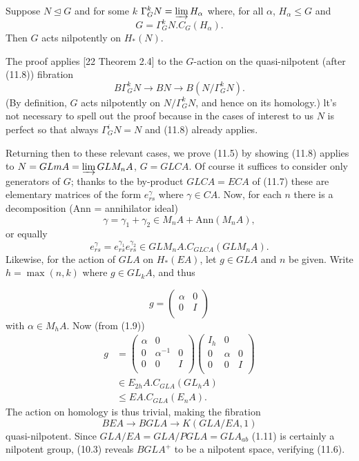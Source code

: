 \begin{prop}
  Suppose $N\unlhd G$ and for some $k$ $\Gamma_G^k N = \varinjlim H_\alpha$ where, for all $\alpha$, $H_\alpha\leqslant G$ and
\[G = \Gamma_G^k N . C_G(H_\alpha).\]
Then $G$ acts nilpotently on $H_*(N)$.
\end{prop}

The proof applies [22 Theorem 2.4] to the $G$-action on the quasi-nilpotent (after (11.8)) fibration
\[B\Gamma_G^k N\longrightarrow BN \longrightarrow B(N/\Gamma_G^k N).\]
(By definition, $G$ acts nilpotently on $N/\Gamma_G^k N$, and hence on its homology.) lt's not necessary to spell out the proof because in the cases of interest to us $N$ is perfect so that always $\Gamma_G^i N = N$ and (11.8) already applies.

Returning then to these relevant cases, we prove (11.5) by showing (11.8) applies to
$N = GLmA = \varinjlim GLM_nA$, $G = GLCA$. Of course it suffices to consider only generators of $G$; thanks to the by-product $GLCA= ECA$ of (11.7) these are elementary matrices of the form $e_{rs}^\gamma$ where $\gamma \in CA$. Now, for each $n$ there is a decomposition ($\mathrm{Ann}$ = annihilator ideal)
\[\gamma= \gamma_1+ \gamma_2 \in M_nA + \mathrm{Ann}(M_nA),\]
or equally
\[e_{rs}^{\gamma} = e_{rs}^{\gamma_1}e_{rs}^{\gamma_2}\in GLM_nA.C_{GLCA}(GLM_nA). \]
Likewise, for the action of $GLA$ on $H_*(EA)$, let $g \in GLA$ and $n$ be given. Write $h = \max (n, k)$ where $g \in GL_kA$, and thus 

\[g=\begin{pmatrix}
  \alpha & 0\\
  0 & I\\
\end{pmatrix}\]
with $\alpha \in M_h A$. Now (from (1.9))
\begin{align*}
  g &=\begin{pmatrix}
  \alpha & 0 & \\
  0 &\alpha^{-1} & 0\\
  0 &0& I\\
\end{pmatrix}\begin{pmatrix}
  I_h& 0 & \\
  0 &\alpha & 0\\
  0 &0& I\\
\end{pmatrix} \\
& \in E_{2h}A.C_{GLA}(GL_hA)\\
&  \leqslant EA.C_{GLA}(E_nA).
\end{align*}
The action on homology is thus trivial, making the fibration 
$$BEA \longrightarrow BGLA \longrightarrow K(GLA/EA, 1)$$
quasi-nilpotent. Since $GLA/EA = GLA/PGLA =GLA_{ab}$ (1.11) is certainly a nilpotent group,
(10.3) reveals $BGLA^+$ to be a nilpotent space, verifying (11.6).

